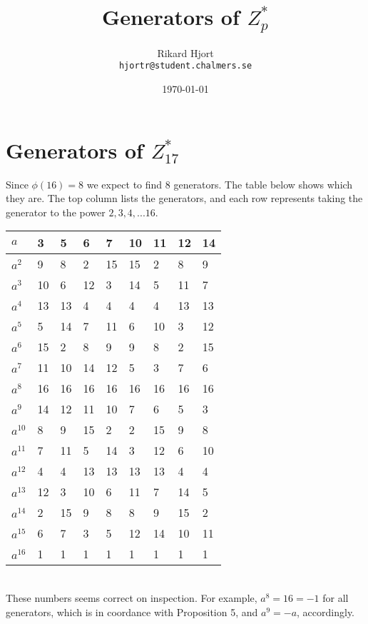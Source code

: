 \documentclass{article}
\title{Generators of $Z^*_p$}
\author{Rikard Hjort\\\texttt{hjortr@student.chalmers.se}}
\date{\today}
\begin{document}
\maketitle

\section{Generators of $Z^*_{17}$}

Since $\phi(16) = 8$ we expect to find 8 generators. The table below shows
which they are. The top column lists the generators, and each row represents
taking the generator to the power $2, 3, 4, ... 16$.

\vspace{1em}
\begin{tabular}{l | l l l l l l l l}
$a    $ &  3 &  5 &  6 &  7 & 10 & 11 & 12 & 14 \\ \hline
$a^{2 }$ &  9 &  8 &  2 & 15 & 15 &  2 &  8 &  9 \\
$a^{3 }$ & 10 &  6 & 12 &  3 & 14 &  5 & 11 &  7 \\
$a^{4 }$ & 13 & 13 &  4 &  4 &  4 &  4 & 13 & 13 \\
$a^{5 }$ &  5 & 14 &  7 & 11 &  6 & 10 &  3 & 12 \\
$a^{6 }$ & 15 &  2 &  8 &  9 &  9 &  8 &  2 & 15 \\
$a^{7 }$ & 11 & 10 & 14 & 12 &  5 &  3 &  7 &  6 \\
$a^{8 }$ & 16 & 16 & 16 & 16 & 16 & 16 & 16 & 16 \\
$a^{9 }$ & 14 & 12 & 11 & 10 &  7 &  6 &  5 &  3 \\
$a^{10}$ &  8 &  9 & 15 &  2 &  2 & 15 &  9 &  8 \\
$a^{11}$ &  7 & 11 &  5 & 14 &  3 & 12 &  6 & 10 \\
$a^{12}$ &  4 &  4 & 13 & 13 & 13 & 13 &  4 &  4 \\
$a^{13}$ & 12 &  3 & 10 &  6 & 11 &  7 & 14 &  5 \\
$a^{14}$ &  2 & 15 &  9 &  8 &  8 &  9 & 15 &  2 \\
$a^{15}$ &  6 &  7 &  3 &  5 & 12 & 14 & 10 & 11 \\
$a^{16}$ &  1 &  1 &  1 &  1 &  1 &  1 &  1 &  1 \\
\end{tabular}
\vspace{1em}
\\
These numbers seems correct on inspection. For example, $a^8 = 16 = -1$ for all
generators, which is in coordance with Proposition 5, and $a^9 = -a$, accordingly.
\end{document}

